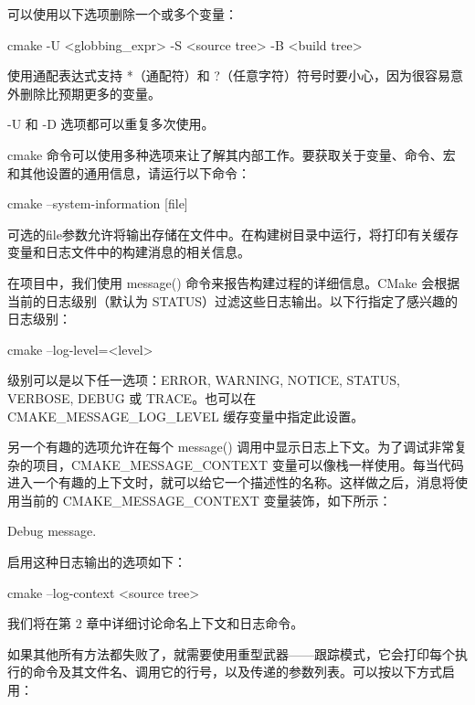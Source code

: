 可以使用以下选项删除一个或多个变量：

\begin{shell}
cmake -U <globbing_expr> -S <source tree> -B <build tree>
\end{shell}

使用通配表达式支持 *（通配符）和 ?（任意字符）符号时要小心，因为很容易意外删除比预期更多的变量。

-U 和 -D 选项都可以重复多次使用。


cmake 命令可以使用多种选项来让了解其内部工作。要获取关于变量、命令、宏和其他设置的通用信息，请运行以下命令：

\begin{shell}
cmake --system-information [file]
\end{shell}

可选的file参数允许将输出存储在文件中。在构建树目录中运行，将打印有关缓存变量和日志文件中的构建消息的相关信息。

在项目中，我们使用 message() 命令来报告构建过程的详细信息。CMake 会根据当前的日志级别（默认为 STATUS）过滤这些日志输出。以下行指定了感兴趣的日志级别：

\begin{shell}
cmake --log-level=<level>
\end{shell}

级别可以是以下任一选项：ERROR, WARNING, NOTICE, STATUS, VERBOSE, DEBUG 或 TRACE。也可以在 CMAKE\_MESSAGE\_LOG\_LEVEL 缓存变量中指定此设置。

另一个有趣的选项允许在每个 message() 调用中显示日志上下文。为了调试非常复杂的项目，CMAKE\_MESSAGE\_CONTEXT 变量可以像栈一样使用。每当代码进入一个有趣的上下文时，就可以给它一个描述性的名称。这样做之后，消息将使用当前的 CMAKE\_MESSAGE\_CONTEXT 变量装饰，如下所示：

\begin{shell}
 Debug message.
\end{shell}

启用这种日志输出的选项如下：

\begin{shell}
cmake --log-context <source tree>
\end{shell}

我们将在第 2 章中详细讨论命名上下文和日志命令。

如果其他所有方法都失败了，就需要使用重型武器——跟踪模式，它会打印每个执行的命令及其文件名、调用它的行号，以及传递的参数列表。可以按以下方式启用：

